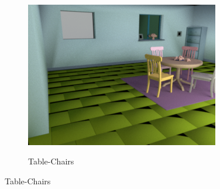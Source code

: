 \documentclass{jov}
\begin{document}
\begin{figure}[t]
\begin{subfigure}[b]{0.22 \textwidth}
        \label{fig:baseSceneMill}
    \end{subfigure}    
    ~
    \begin{subfigure}[b]{0.22 \textwidth}
        \caption{Table-Chairs}    
        \includegraphics[width=\textwidth]{../Figures/Figure3/Figure3_c.png}
        \label{fig:baseSceneTableChairs}
    \end{subfigure}
    

\end{figure}
\end{document}
